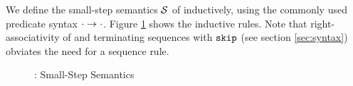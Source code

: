 
We define the small-step semantics $\mathcal{S}$ of \svlidf inductively, using the commonly used predicate syntax ${\cdot} \rightarrow^{} {\cdot}$.
Figure \ref{fig:svl-sem-dyn-sstep} shows the inductive rules.
Note that right-associativity of \ttt{;} and terminating sequences with $\textup{\texttt{skip}}$ (see section \ref{sec:syntax}) obviates the need for a sequence rule.

\begin{figure}
    \boxed{\sstep{\pi}{\pi}}
    
    \caption{\svlidf: Small-Step Semantics}
    \label{fig:svl-sem-dyn-sstep}
\end{figure}